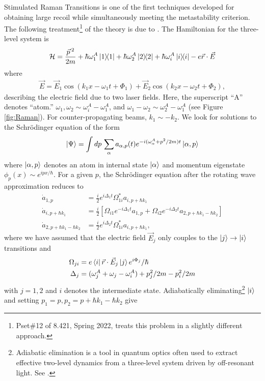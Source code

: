 \documentclass[reprint,
nofootinbib,
amsmath,amssymb,
aps]{revtex4-1}
\newcommand{\al}{\alpha}
\newcommand{\f}[2]{\frac{#1}{#2}}
\newcommand{\lb}{\left[}
\newcommand{\rb}{\right]}
\begin{document}
Stimulated Raman Transitions is one of the first techniques developed for obtaining large recoil while simultaneously meeting the metastability criterion. The following treatment\footnote{Pset\#12 of 8.421, Spring 2022, treats this problem in a slightly different approach.} of the theory is due to \cite{kasevich1992measurement}. The Hamiltonian for the three-level system is 
\begin{align*}
\mathcal{H} = \f{\vec{p}\,^2}{2m} + \hbar \omega_1^A \ketbra{1} + \hbar \omega_2^A \ketbra{2} + \hbar \omega_i^A \ketbra{i} - e\vec{r}\cdot \vec{E}
\end{align*}
where
\begin{align*}
\vec{E} = \vec{E}_1 \cos(k_1 x - \omega_1 t + \Phi_1) + \vec{E}_2 \cos(k_2 x - \omega_2 t + \Phi_2),
\end{align*}
describing the electric field due to two laser fields. Here, the superscript ``A'' denotes ``atom.'' $\omega_1, \omega_2 \sim \omega^A_i - \omega_1^A$, and $\omega_1 - \omega_2 \sim \omega_2^A - \omega_1^A$ (see Figure \ref{fig:Raman}). For counter-propagating beams, $k_1 \sim -k_2$. We look for solutions to the Schr\"{o}dinger equation of the form 
\begin{align*}
\ket{\Psi} = \int dp\, \sum_\al a_{\al,p}(t) e^{-i(\omega_\al^A + p^2/2m) t } \ket{\al,p}
\end{align*}
where $\ket{\al,p}$ denotes an atom in internal state $\ket{\al}$ and momentum eigenstate $ \phi_p(x) \sim e^{ipx/\hbar}$. For a given $p$, the Schr\"{o}dinger equation after the rotating wave approximation reduces to 
\begin{align*}
\dot{a}_{1,p} &= \f{i}{2}e^{i\Delta_1 t} \Omega^*_{1i} a_{i,p+\hbar k_1}\\
\dot{a}_{i,p + \hbar k_1} &= \f{i}{2}\lb \Omega_{i1}e^{-i\Delta_1 t } a_{1,p}+ \Omega_{i2} e^{-i\Delta_2 t}a_{2,p+\hbar k_1 - \hbar k_2} \rb \\
\dot{a}_{2,p+\hbar k_1 - \hbar k_2} &= \f{i}{2}e^{i\Delta_2 t}\Omega_{1i}^* a_{i,p+\hbar k_1},
\end{align*}
where we have assumed that the electric field $\vec{E}_j$ only couples to the $\ket{j} \to \ket{i}$ transitions and 
\begin{align*}
\Omega_{ji} &= e\bra{i} \vec{r}\cdot \vec{E}_j \ket{j} e^{i\Phi_j}/\hbar\\
\Delta_j &= (\omega_j^A + \omega_j - \omega_i^A) + p_j^2/2m - p_i^2/2m
\end{align*}
with $j=1,2$ and $i$ denotes the intermediate state. Adiabatically eliminating\footnote{Adiabatic elimination is a tool in quantum optics often used to extract effective two-level dynamics from a three-level system driven by off-resonant light. See \cite{brion2007adiabatic}.} $\ket{i}$ and setting $p_1 = p, p_2 = p+ \hbar k_1 - \hbar k_2$ give 
\end{document}
